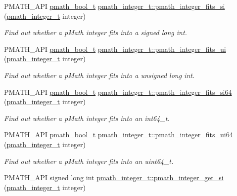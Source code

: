 \begin{CompactItemize}
PMATH\_\-API \hyperlink{group__general__types_gc92090cb0b56345d6c379ed2341d4ef4}{pmath\_\-bool\_\-t} \hyperlink{group__numbers_gc220e06754067b9ba4a7c823017ad32e}{pmath\_\-integer\_\-t::pmath\_\-integer\_\-fits\_\-si} (\hyperlink{classpmath__integer__t}{pmath\_\-integer\_\-t} integer)
\begin{CompactList}\small\item\em Find out whether a pMath integer fits into a signed long int. \item\end{CompactList}\item 
PMATH\_\-API \hyperlink{group__general__types_gc92090cb0b56345d6c379ed2341d4ef4}{pmath\_\-bool\_\-t} \hyperlink{group__numbers_gb12e5e34b7918cb6beee23c57cdd0d36}{pmath\_\-integer\_\-t::pmath\_\-integer\_\-fits\_\-ui} (\hyperlink{classpmath__integer__t}{pmath\_\-integer\_\-t} integer)
\begin{CompactList}\small\item\em Find out whether a pMath integer fits into a unsigned long int. \item\end{CompactList}\item 
PMATH\_\-API \hyperlink{group__general__types_gc92090cb0b56345d6c379ed2341d4ef4}{pmath\_\-bool\_\-t} \hyperlink{group__numbers_g3533b0ffc74d5cc7a0b618c5127ab5de}{pmath\_\-integer\_\-t::pmath\_\-integer\_\-fits\_\-si64} (\hyperlink{classpmath__integer__t}{pmath\_\-integer\_\-t} integer)
\begin{CompactList}\small\item\em Find out whether a pMath integer fits into an int64\_\-t. \item\end{CompactList}\item 
PMATH\_\-API \hyperlink{group__general__types_gc92090cb0b56345d6c379ed2341d4ef4}{pmath\_\-bool\_\-t} \hyperlink{group__numbers_gc783aa678e68ed2f877ccdb0ea8cca7d}{pmath\_\-integer\_\-t::pmath\_\-integer\_\-fits\_\-ui64} (\hyperlink{classpmath__integer__t}{pmath\_\-integer\_\-t} integer)
\begin{CompactList}\small\item\em Find out whether a pMath integer fits into an uint64\_\-t. \item\end{CompactList}\item 
PMATH\_\-API signed long int \hyperlink{group__numbers_g12219f6f678ed0ddff66d352e0dabbd1}{pmath\_\-integer\_\-t::pmath\_\-integer\_\-get\_\-si} (\hyperlink{classpmath__integer__t}{pmath\_\-integer\_\-t} integer)

\end{CompactItemize}
